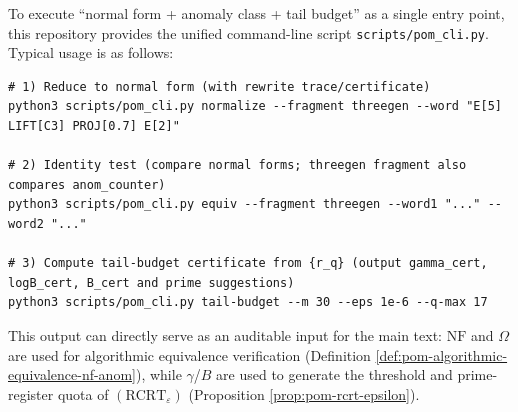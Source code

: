 \begin{remark}\label{rem:pom-cli-one-shot}
To execute ``normal form + anomaly class + tail budget'' as a single entry point, this repository provides the unified command-line script \texttt{scripts/pom\_cli.py}.
Typical usage is as follows:
\begin{verbatim}
# 1) Reduce to normal form (with rewrite trace/certificate)
python3 scripts/pom_cli.py normalize --fragment threegen --word "E[5] LIFT[C3] PROJ[0.7] E[2]"

# 2) Identity test (compare normal forms; threegen fragment also compares anom_counter)
python3 scripts/pom_cli.py equiv --fragment threegen --word1 "..." --word2 "..."

# 3) Compute tail-budget certificate from {r_q} (output gamma_cert, logB_cert, B_cert and prime suggestions)
python3 scripts/pom_cli.py tail-budget --m 30 --eps 1e-6 --q-max 17
\end{verbatim}
This output can directly serve as an auditable input for the main text: \(\mathrm{NF}\) and \(\Omega\) are used for algorithmic equivalence verification (Definition \ref{def:pom-algorithmic-equivalence-nf-anom}), while \(\gamma\)/\(B\) are used to generate the threshold and prime-register quota of \((\mathrm{RCRT}_\varepsilon)\) (Proposition \ref{prop:pom-rcrt-epsilon}).
\end{remark}


